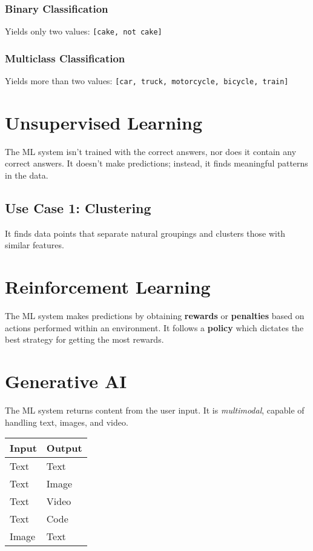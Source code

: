 \documentclass[a4paper,12pt]{article}
\begin{document}
\subsubsection{Binary Classification}
Yields only two values: \texttt{[cake, not cake]}

\subsubsection{Multiclass Classification}
Yields more than two values: \texttt{[car, truck, motorcycle, bicycle, train]}

\section{Unsupervised Learning}
The ML system isn't trained with the correct answers, nor does it contain any correct answers. It doesn't make predictions; instead, it finds meaningful patterns in the data.

\subsection{Use Case 1: Clustering}
It finds data points that separate natural groupings and clusters those with similar features.

\section{Reinforcement Learning}
The ML system makes predictions by obtaining \textbf{rewards} or \textbf{penalties} based on actions performed within an environment. It follows a \textbf{policy} which dictates the best strategy for getting the most rewards.

\section{Generative AI}
The ML system returns content from the user input. It is \textit{multimodal}, capable of handling text, images, and video.

\begin{center}
\begin{tabular}{@{}ll@{}}
\toprule
Input & Output \\
\midrule
Text & Text \\
Text & Image \\
Text & Video \\
Text & Code \\
Image & Text \\
\bottomrule
\end{tabular}
\end{center}
\end{document}
